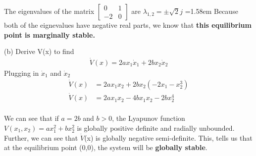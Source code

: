 \documentclass{article}
\begin{document}
  The eigenvalues of the matrix $\begin{bmatrix}
      0 & 1 \\
      -2 & 0
  \end{bmatrix}$ are $\lambda_{1,2} = \pm \sqrt{2}j$
  \newline
  \hangindent=1.58em
   Because both of the eignevalues have negative real parts, we know that \textbf{this
  equilibrium point is marginally stable.} \newpage

  (b) Derive V(x) to find
  \begin{align*}
    \dot{V}(x) = 2ax_1\dot{x}_1 + 2bx_2\dot{x}_2
  \end{align*}
  \indent Plugging in $\dot{x}_1$ and $\dot{x}_2$
  \begin{align*}
    \dot{V}(x) &= 2ax_1x_2 + 2bx_2(-2x_1 - x_2^3) \\
    \dot{V}(x) &= 2ax_1x_2 - 4bx_1x_2 - 2bx_2^4 \\
  \end{align*}

  We can see that if $a=2b$ and $b>0$, the Lyapunov function $V(x_1, x_2) = ax_1^2
    + bx_2^2$ is globally positive definite and radially unbounded. Further, we
    can see that $\dot{V}$(x) is globally negative semi-definite. This, tells us
    that at the equilibrium point (0,0), the system will be \textbf{globally stable}.
 
     
 
\end{document}
